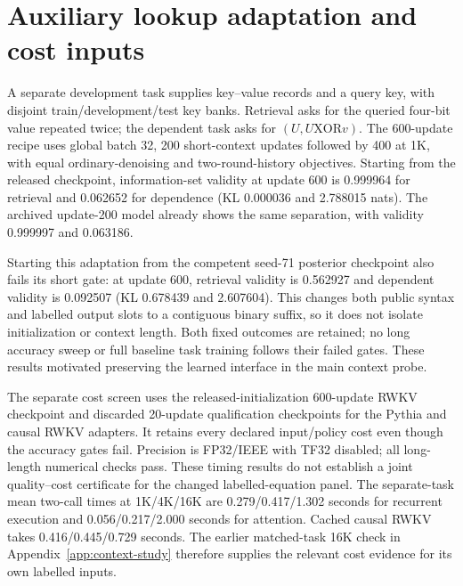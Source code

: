 \documentclass{article}
\begin{document}
{\small}
\clearpage
\appendix




\section{Auxiliary lookup adaptation and cost inputs}
\label{app:lookup}
A separate development task supplies key--value records and a query key, with
disjoint train/development/test key banks. Retrieval asks for the queried
four-bit value repeated twice; the dependent task asks for
$(U,U\mathbin{\mathrm{XOR}}v)$. The 600-update recipe uses global batch 32,
200 short-context updates followed by 400 at 1K, with equal ordinary-denoising
and two-round-history objectives. Starting from the released checkpoint,
information-set validity at update 600 is 0.999964 for retrieval and 0.062652
for dependence (KL 0.000036 and 2.788015 nats). The archived update-200 model
already shows the same separation, with validity 0.999997 and 0.063186.

Starting this adaptation from the competent seed-71 posterior checkpoint
also fails its short gate: at update 600, retrieval validity is 0.562927 and
dependent validity is 0.092507 (KL 0.678439 and 2.607604). This changes both
public syntax and labelled output slots to a contiguous binary suffix, so it
does not isolate initialization or context length. Both fixed outcomes are
retained; no long accuracy sweep or full baseline task training follows their
failed gates. These results motivated preserving the learned interface in the
main context probe.

The separate cost screen uses the released-initialization 600-update RWKV
checkpoint and discarded 20-update qualification checkpoints for the Pythia
and causal RWKV adapters. It retains every declared input/policy cost even
though the accuracy gates fail. Precision is FP32/IEEE with TF32 disabled;
all long-length numerical checks pass. These timing results do not establish
a joint quality--cost certificate for the changed labelled-equation panel.
The separate-task mean two-call times at 1K/4K/16K are
0.279/0.417/1.302 seconds for recurrent execution and
0.056/0.217/2.000 seconds for attention. Cached causal RWKV takes
0.416/0.445/0.729 seconds. The earlier matched-task 16K check in Appendix~\ref{app:context-study}
therefore supplies the relevant cost evidence for its own labelled inputs.
\end{document}
